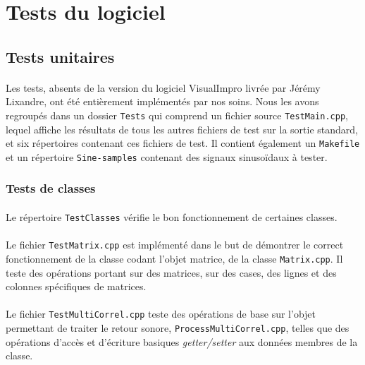 \newpage
\section{Tests du logiciel}

\subsection{Tests unitaires}

\paragraph{}
Les tests, absents de la version du logiciel VisualImpro livrée par
Jérémy Lixandre, ont été entièrement implémentés par nos soins. Nous
les avons regroupés dans un dossier \verb!Tests! qui comprend un
fichier source \verb!TestMain.cpp!, lequel affiche les résultats de
tous les autres fichiers de test sur la sortie standard, et six
répertoires contenant ces fichiers de test. Il contient également un
\verb!Makefile! et un répertoire \verb!Sine-samples! contenant des
signaux sinusoïdaux à tester.

\subsubsection{Tests de classes}
\paragraph{}
Le répertoire \verb!TestClasses! vérifie le bon fonctionnement de
certaines classes.

\paragraph{}
Le fichier \verb!TestMatrix.cpp! est implémenté dans le but de
démontrer le correct fonctionnement de la classe codant l'objet
matrice, de la classe \verb!Matrix.cpp!. Il teste des opérations
portant sur des matrices, sur des cases, des lignes et des colonnes
spécifiques de matrices.

\paragraph{}
Le fichier \verb!TestMultiCorrel.cpp! teste des opérations de base sur
l'objet permettant de traiter le retour sonore,
\verb!ProcessMultiCorrel.cpp!, telles que des opérations d'accès et
d'écriture basiques \textit{getter/setter} aux données membres de la
classe.

